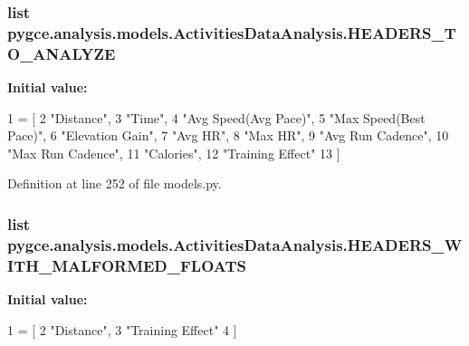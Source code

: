 \subsubsection[{\texorpdfstring{H\+E\+A\+D\+E\+R\+S\+\_\+\+T\+O\+\_\+\+A\+N\+A\+L\+Y\+ZE}{HEADERS_TO_ANALYZE}}]{\setlength{\rightskip}{0pt plus 5cm}list pygce.\+analysis.\+models.\+Activities\+Data\+Analysis.\+H\+E\+A\+D\+E\+R\+S\+\_\+\+T\+O\+\_\+\+A\+N\+A\+L\+Y\+ZE\hspace{0.3cm}{\ttfamily [static]}}\hypertarget{classpygce_1_1analysis_1_1models_1_1_activities_data_analysis_a799ad90125cc686b985fe525a3b33062}{}\label{classpygce_1_1analysis_1_1models_1_1_activities_data_analysis_a799ad90125cc686b985fe525a3b33062}
{\bfseries Initial value\+:}
\begin{DoxyCode}
1 = [
2         \textcolor{stringliteral}{"Distance"},
3         \textcolor{stringliteral}{"Time"},
4         \textcolor{stringliteral}{"Avg Speed(Avg Pace)"},
5         \textcolor{stringliteral}{"Max Speed(Best Pace)"},
6         \textcolor{stringliteral}{"Elevation Gain"},
7         \textcolor{stringliteral}{"Avg HR"},
8         \textcolor{stringliteral}{"Max HR"},
9         \textcolor{stringliteral}{"Avg Run Cadence"},
10         \textcolor{stringliteral}{"Max Run Cadence"},
11         \textcolor{stringliteral}{"Calories"},
12         \textcolor{stringliteral}{"Training Effect"}
13     ]
\end{DoxyCode}


Definition at line 252 of file models.\+py.

\subsubsection[{\texorpdfstring{H\+E\+A\+D\+E\+R\+S\+\_\+\+W\+I\+T\+H\+\_\+\+M\+A\+L\+F\+O\+R\+M\+E\+D\+\_\+\+F\+L\+O\+A\+TS}{HEADERS_WITH_MALFORMED_FLOATS}}]{\setlength{\rightskip}{0pt plus 5cm}list pygce.\+analysis.\+models.\+Activities\+Data\+Analysis.\+H\+E\+A\+D\+E\+R\+S\+\_\+\+W\+I\+T\+H\+\_\+\+M\+A\+L\+F\+O\+R\+M\+E\+D\+\_\+\+F\+L\+O\+A\+TS\hspace{0.3cm}{\ttfamily [static]}}\hypertarget{classpygce_1_1analysis_1_1models_1_1_activities_data_analysis_a272e010f956a64a8f916ebf1b9e14255}{}\label{classpygce_1_1analysis_1_1models_1_1_activities_data_analysis_a272e010f956a64a8f916ebf1b9e14255}
{\bfseries Initial value\+:}
\begin{DoxyCode}
1 = [
2         \textcolor{stringliteral}{"Distance"},
3         \textcolor{stringliteral}{"Training Effect"}
4     ]
\end{DoxyCode}


